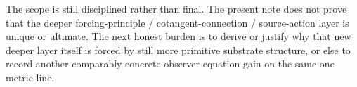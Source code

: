 \documentclass[11pt]{article}
\begin{document}
The scope is still disciplined rather than final. The present note does not prove that the deeper forcing-principle / cotangent-connection / source-action layer is unique or ultimate. The next honest burden is to derive or justify why that new deeper layer itself is forced by still more primitive substrate structure, or else to record another comparably concrete observer-equation gain on the same one-metric line.
\end{document}
